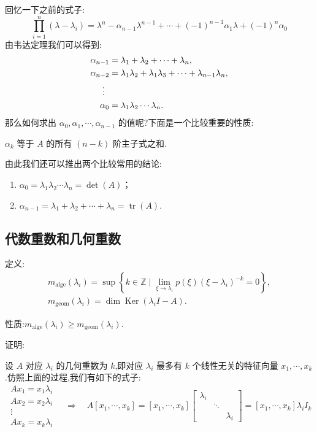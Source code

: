 回忆一下之前的式子:
\[
    \prod_{i=1}^n (\lambda - \lambda_i) = \lambda^n - \alpha_{n-1}\lambda^{n-1} + \cdots + (-1)^{n-1}\alpha_1\lambda + (-1)^n\alpha_0
\]
由韦达定理我们可以得到:
\[
    \begin{aligned}
        \alpha_{n-1} &= \lambda_1 + \lambda_2 + \cdots + \lambda_n, \\
        \alpha_{n-2} &= \lambda_1\lambda_2 + \lambda_1\lambda_3 + \cdots + \lambda_{n-1}\lambda_n, \\
        \vdotswithin{=} \\
        \alpha_0 &= \lambda_1\lambda_2\cdots\lambda_n.
    \end{aligned}
\]
那么如何求出 $\alpha_0,\alpha_1,\cdots,\alpha_{n-1}$ 的值呢?下面是一个比较重要的性质:

\begin{lemma}
$\alpha_k$ 等于 $A$ 的所有 $(n-k)$ 阶主子式之和.
\end{lemma}


由此我们还可以推出两个比较常用的结论:
\begin{enumerate}
    \item $\alpha_0 = \lambda_1\lambda_2\cdots\lambda_n = \det(A)$；
    \item $\alpha_{n-1} = \lambda_1 + \lambda_2 + \cdots + \lambda_n = \operatorname{tr}(A)$.
\end{enumerate}

\subsection{代数重数和几何重数}

定义:
\[
    \begin{gathered}
        m_{\mathrm{alge}}(\lambda_i) = \sup\left\{k \in \mathbb{Z} \mid \lim_{\xi \to \lambda_i} p(\xi)(\xi - \lambda_i)^{-k} = 0 \right\}, \\
        m_{\mathrm{geom}}(\lambda_i) = \dim \operatorname{Ker}(\lambda_i I - A).
    \end{gathered}
\]

性质:$m_{\mathrm{alge}}(\lambda_i) \ge m_{\mathrm{geom}}(\lambda_i)$.

证明:

设 $A$ 对应 $\lambda_i$ 的几何重数为 $k$,即对应 $\lambda_i$ 最多有 $k$ 个线性无关的特征向量 $x_1,\cdots,x_k$.仿照上面的过程,我们有如下的式子:
\[
    \begin{gathered}
        Ax_1 = x_1\lambda_i \\
        Ax_2 = x_2\lambda_i \\
        \vdots \\
        Ax_k = x_k\lambda_i
    \end{gathered}
    \quad \Rightarrow \quad
    A[x_1,\cdots,x_k] = [x_1,\cdots,x_k]
    \begin{bmatrix}
        \lambda_i & & \\
        & \ddots & \\
        & & \lambda_i
    \end{bmatrix}
    = [x_1,\cdots,x_k]\lambda_i I_k
\]

